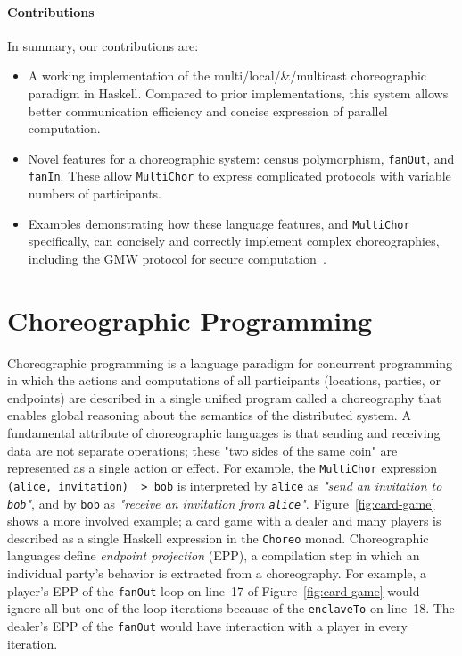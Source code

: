 \documentclass[sigplan,screen,review,anonymous]{acmart}
\newcommand{\inlinecode}[2][haskell]{\texttt{#2}}
\newcommand{\MultiChor}{\texttt{Multi\-Chor}\xspace}
\begin{document}
\paragraph{Contributions}\label{sec:contributions}
In summary, our contributions are:
\begin{itemize}[leftmargin=12pt]
    \item A working implementation of the multi\-/local\-/\&\-/multicast choreographic paradigm
    in Haskell.
    Compared to prior implementations, this system allows better communication efficiency
    and concise expression of parallel computation.
    \item Novel features for a choreographic system:
    census polymorphism, \inlinecode{fanOut}, and \inlinecode{fanIn}.
    These allow \MultiChor to express complicated protocols with variable numbers of participants.
    \item Examples demonstrating how these language features, and \MultiChor specifically,
    can concisely and correctly implement complex choreographies,
    including the GMW protocol for secure computation~\cite{goldreich2019play}.
\end{itemize}
\newpage
\section{Choreographic Programming}\label{sec:background}


Choreographic programming is a language paradigm for concurrent programming in which
the actions and computations of all participants (locations, parties, or endpoints)
are described in a single unified program called a choreography that enables global reasoning about the semantics of the distributed system.
A fundamental attribute of choreographic languages is that
sending and receiving data are not separate operations;
these "two sides of the same coin" are represented as a single action or effect.
For example, the \MultiChor expression
\inlinecode{(alice, invitation) ~> bob}
is interpreted by \inlinecode{alice} as \textit{"send an invitation to \inlinecode{bob}"},
and by \inlinecode{bob} as \textit{"receive an invitation from \inlinecode{alice}"}.
Figure~\ref{fig:card-game} shows a more involved example;
a card game with a dealer and many players is described as a single Haskell expression
in the \inlinecode{Choreo} monad.
Choreographic languages define \emph{endpoint projection} (EPP),
a compilation step in which an individual party's behavior is extracted from a choreography.
For example, a player's EPP of the \inlinecode{fanOut} loop on
line~17 of Figure~\ref{fig:card-game}
would ignore all but one of the loop iterations
because of the \inlinecode{enclaveTo} on line~18.
The dealer's EPP of the \inlinecode{fanOut} would have interaction with a player
in every iteration.
\end{document}
